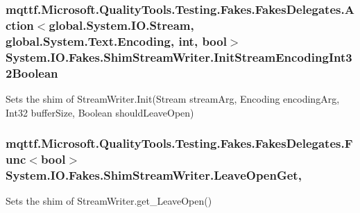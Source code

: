 \hypertarget{class_system_1_1_i_o_1_1_fakes_1_1_shim_stream_writer_a782ffe2365cefcbcbb1ffc24f515e596}{
\subsubsection[{Init\-Stream\-Encoding\-Int32\-Boolean}]{\setlength{\rightskip}{0pt plus 5cm}mqttf.\-Microsoft.\-Quality\-Tools.\-Testing.\-Fakes.\-Fakes\-Delegates.\-Action$<$global.\-System.\-I\-O.\-Stream, global.\-System.\-Text.\-Encoding, int, bool$>$ System.\-I\-O.\-Fakes.\-Shim\-Stream\-Writer.\-Init\-Stream\-Encoding\-Int32\-Boolean\hspace{0.3cm}{\ttfamily [set]}}}\label{class_system_1_1_i_o_1_1_fakes_1_1_shim_stream_writer_a782ffe2365cefcbcbb1ffc24f515e596}


Sets the shim of Stream\-Writer.\-Init(\-Stream stream\-Arg, Encoding encoding\-Arg, Int32 buffer\-Size, Boolean should\-Leave\-Open)

\hypertarget{class_system_1_1_i_o_1_1_fakes_1_1_shim_stream_writer_acd92ae61881f4025c97255bed2203985}{
\subsubsection[{Leave\-Open\-Get}]{\setlength{\rightskip}{0pt plus 5cm}mqttf.\-Microsoft.\-Quality\-Tools.\-Testing.\-Fakes.\-Fakes\-Delegates.\-Func$<$bool$>$ System.\-I\-O.\-Fakes.\-Shim\-Stream\-Writer.\-Leave\-Open\-Get\hspace{0.3cm}{\ttfamily [get]}, {\ttfamily [set]}}}\label{class_system_1_1_i_o_1_1_fakes_1_1_shim_stream_writer_acd92ae61881f4025c97255bed2203985}


Sets the shim of Stream\-Writer.\-get\-\_\-\-Leave\-Open()

